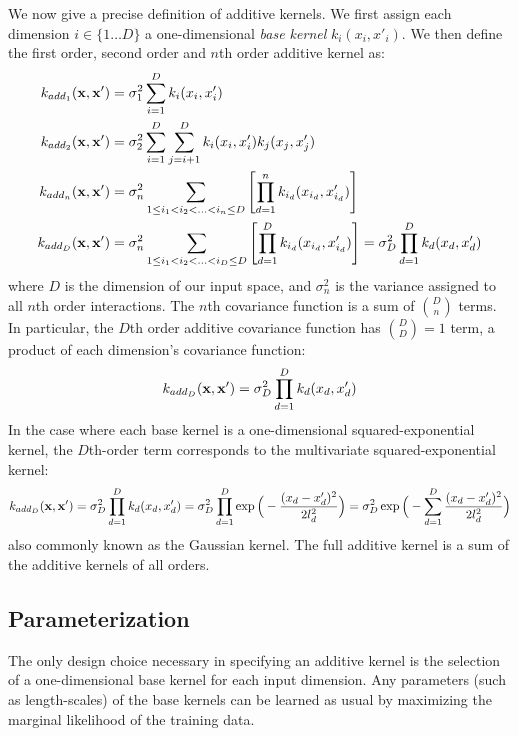 We now give a precise definition of additive kernels.  %
We first assign each dimension $i \in \{1 \dots D\}$ a one-dimensional \emph{base kernel} $k_i(x_i, x'_i)$.
We then define the first order, second order and $n$th order additive kernel as:
%
\begin{align}
k_{add_1}({\bf x, x'}) & = \sigma_1^2 \sum_{i=1}^D k_i(x_i, x_i') \\
k_{add_2}({\bf x, x'}) & = \sigma_2^2 \sum_{i=1}^D \sum_{j = i + 1}^D k_i(x_i, x_i') k_j(x_j, x_j') \\
k_{add_n}({\bf x, x'}) & = \sigma_n^2 \sum_{1 \leq i_1 < i_2 < ... < i_n \leq D} \left[ \prod_{d=1}^n k_{i_d}(x_{i_d}, x_{i_d}') \right] \\
k_{add_D}({\bf x, x'}) & = \sigma_n^2 \sum_{1 \leq i_1 < i_2 < ... < i_D \leq D} \left[ \prod_{d=1}^D k_{i_d}(x_{i_d}, x_{i_d}') \right] = \sigma_D^2 \prod_{d=1}^D k_{d}(x_{d}, x_{d}')
\end{align}
%
where $D$ is the dimension of our input space, and $\sigma_n^2$ is the variance assigned to all $n$th order interactions.
The $n$th covariance function is a sum of ${D \choose n}$ terms.
In particular, the $D$th order additive covariance function has ${D \choose D} = 1$ term, a product of each dimension's covariance function:
%
\begin{align}
k_{add_D}({\bf x, x'}) = \sigma_D^2 \prod_{d=1}^D k_{d}(x_{d}, x_{d}')
\end{align}
%
In the case where each base kernel is a one-dimensional squared-exponential kernel, the $D$th-order term corresponds to the multivariate squared-exponential kernel:
%
\begin{align}
k_{add_D}({\bf x, x'}) = \sigma_D^2 \prod_{d=1}^D k_{d}(x_{d}, x_{d}') = \sigma_D^2 \prod_{d=1}^D \exp \Big( -\frac{ ( x_{d} - x_{d}')^2}{2l^2_d} \Big) = \sigma_D^2  \exp \Big( -\sum_{d=1}^D \frac{ ( x_{d} - x_{d}')^2}{2l^2_d} \Big)
%
\end{align}
also commonly known as the Gaussian kernel.
The full additive kernel is a sum of the additive kernels of all orders.



\subsection{Parameterization}
The only design choice necessary in specifying an additive kernel is the selection of a one-dimensional base kernel for each input dimension.
Any parameters (such as length-scales) of the base kernels can be learned as usual by maximizing the marginal likelihood of the training data.  


